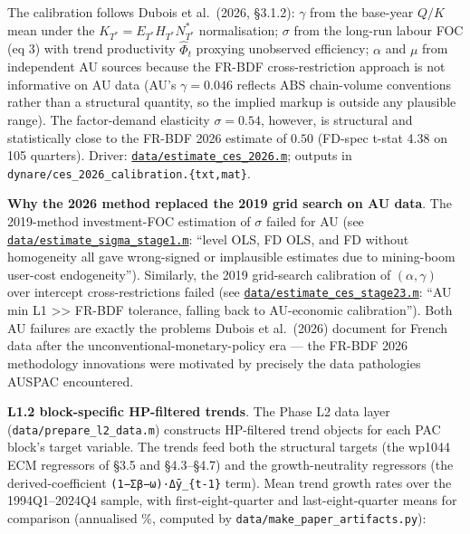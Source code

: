 \documentclass[
]{article}
\begin{document}
The calibration follows Dubois et al.~(2026, §3.1.2): \(\gamma\) from
the base-year \(Q/K\) mean under the \(K_{T^*}=E_{T^*}H_{T^*}N^*_{T^*}\)
normalisation; \(\sigma\) from the long-run labour FOC (eq 3) with trend
productivity \(\hat\Phi_t\) proxying unobserved efficiency; \(\alpha\)
and \(\mu\) from independent AU sources because the FR-BDF
cross-restriction approach is not informative on AU data (AU's
\(\gamma=0.046\) reflects ABS chain-volume conventions rather than a
structural quantity, so the implied markup is outside any plausible
range). The factor-demand elasticity \(\sigma=0.54\), however, is
structural and statistically close to the FR-BDF 2026 estimate of
\(0.50\) (FD-spec t-stat 4.38 on 105 quarters). Driver:
\href{../data/estimate_ces_2026.m}{\texttt{data/estimate\_ces\_2026.m}};
outputs in \texttt{dynare/ces\_2026\_calibration.\{txt,mat\}}.

\textbf{Why the 2026 method replaced the 2019 grid search on AU data}.
The 2019-method investment-FOC estimation of \(\sigma\) failed for AU
(see
\href{../data/estimate_sigma_stage1.m}{\texttt{data/estimate\_sigma\_stage1.m}}:
``level OLS, FD OLS, and FD without homogeneity all gave wrong-signed or
implausible estimates due to mining-boom user-cost endogeneity'').
Similarly, the 2019 grid-search calibration of \((\alpha, \gamma)\) over
intercept cross-restrictions failed (see
\href{../data/estimate_ces_stage23.m}{\texttt{data/estimate\_ces\_stage23.m}}:
``AU min L1 \textgreater\textgreater{} FR-BDF tolerance, falling back to
AU-economic calibration''). Both AU failures are exactly the problems
Dubois et al.~(2026) document for French data after the
unconventional-monetary-policy era --- the FR-BDF 2026 methodology
innovations were motivated by precisely the data pathologies AUSPAC
encountered.

\textbf{L1.2 block-specific HP-filtered trends}. The Phase L2 data layer
(\texttt{data/prepare\_l2\_data.m}) constructs HP-filtered trend objects
for each PAC block's target variable. The trends feed both the
structural targets (the wp1044 ECM regressors of §3.5 and §4.3--§4.7)
and the growth-neutrality regressors (the derived-coefficient
\texttt{(1−Σβ−ω)·Δȳ\_\{t-1\}} term). Mean trend growth rates over the
1994Q1--2024Q4 sample, with first-eight-quarter and last-eight-quarter
means for comparison (annualised \%, computed by
\texttt{data/make\_paper\_artifacts.py}):
\end{document}
